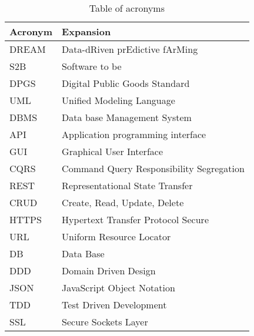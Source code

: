 \begin{table}[H]
    \setlength\arrayrulewidth{1pt}
    \centering
    \begin{tabular}{|l|l|}
        \rowcolor{myblue}
        \hline
        \color{white}Acronym & \color{white}Expansion \\
        \hline
        \textsc{DREAM}  &    Data-dRiven prEdictive fArMing \\
        \hline
        \textsc{S2B}     &   Software to be \\
        \hline
        \textsc{DPGS}  &    Digital Public Goods Standard\\
        \hline
        \textsc{UML}  &    Unified Modeling Language\\
        \hline
        \textsc{DBMS}  &    Data base Management System \\
        \hline
        \textsc{API}  &    Application programming interface \\
        \hline
        \textsc{GUI}  &    Graphical User Interface \\
        \hline
        \textsc{CQRS}  &    Command Query Responsibility Segregation \\
        \hline
        \textsc{REST}  &    Representational State Transfer \\
        \hline
        \textsc{CRUD}  &    Create, Read, Update, Delete \\
        \hline
        \textsc{HTTPS}  &    Hypertext Transfer Protocol Secure \\
        \hline
        \textsc{URL}  &    Uniform Resource Locator \\
        \hline
        \textsc{DB}  &    Data Base \\
        \hline
        \textsc{DDD}  &    Domain Driven Design \\
        \hline
        \textsc{JSON}  &    JavaScript Object Notation \\
        \hline
        \textsc{TDD}  &    Test Driven Development \\
        \hline
        \textsc{SSL}  &    Secure Sockets Layer \\
        \hline
        
        
    \end{tabular}
    
    \caption{\label{tab:acronymsTable}Table of acronyms}
    
\end{table}

